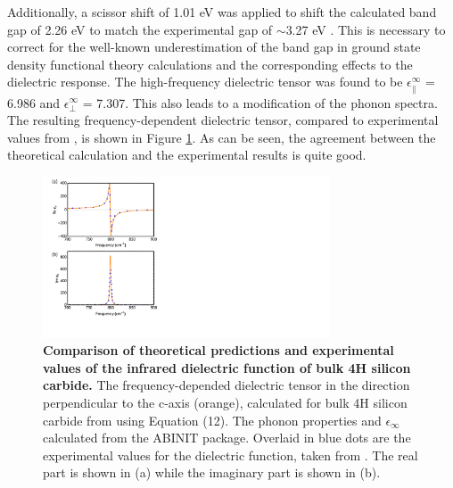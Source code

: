 \documentclass[superscriptaddress,reprint,prb]{revtex4-1}
\begin{document}
Additionally, a scissor shift of 1.01 eV was applied to shift the calculated band gap of 2.26 eV to match the experimental gap of $\sim$3.27 eV \cite{band_gap_expt1,band_gap_expt2}. This is necessary to correct for the well-known underestimation of the band gap in ground state density functional theory calculations and the corresponding effects to the dielectric response.
The high-frequency dielectric tensor was found to be $\epsilon^{\infty}_{\parallel}$ = 6.986 and $\epsilon^{\infty}_{\perp}$ = 7.307.  This also leads to a modification of the phonon spectra. %
The resulting frequency-dependent dielectric tensor, compared to experimental values from \cite{tiwald1999carrier}, is shown in Figure \ref{fig:epsilon}. As can be seen, the agreement between the theoretical calculation and the experimental results is quite good. 

\begin{figure}[t]
\includegraphics[width=8.5cm]{SiC_comparison_thy_vs_expt.pdf}
\caption{\textbf{Comparison of theoretical predictions and experimental values of the infrared dielectric function of bulk 4H silicon carbide.} The frequency-depended dielectric tensor in the direction perpendicular to the c-axis (orange), calculated for bulk 4H silicon carbide from using Equation (12). The phonon properties and $\epsilon_{\infty}$ calculated from the ABINIT package. Overlaid in blue dots are the experimental values for the dielectric function, taken from \cite{tiwald1999carrier}. The real part is shown in (a) while the imaginary part is shown in (b). }
\label{fig:epsilon}
\end{figure}
\end{document}

